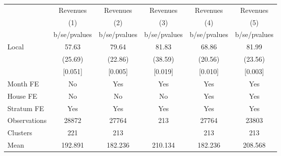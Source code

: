 {
\def\sym#1{\ifmmode^{#1}\else\(^{#1}\)\fi}
\begin{tabular}{l*{5}{c}}
\toprule
                &\multicolumn{1}{c}{Revenues}&\multicolumn{1}{c}{Revenues}&\multicolumn{1}{c}{Revenues}&\multicolumn{1}{c}{Revenues}&\multicolumn{1}{c}{Revenues}\\
                &\multicolumn{1}{c}{(1)}&\multicolumn{1}{c}{(2)}&\multicolumn{1}{c}{(3)}&\multicolumn{1}{c}{(4)}&\multicolumn{1}{c}{(5)}\\
                &b/se/pvalues&b/se/pvalues&b/se/pvalues&b/se/pvalues&b/se/pvalues\\
\midrule
Local           &    57.63&    79.64&    81.83&    68.86&    81.99\\
                &  (25.69)&  (22.86)&  (38.59)&  (20.56)&  (23.56)\\
                &  [0.051]&  [0.005]&  [0.019]&  [0.010]&  [0.003]\\
Month FE        &       No&      Yes&      Yes&      Yes&      Yes\\
House FE        &       No&       No&       No&      Yes&      Yes\\
Stratum FE      &      Yes&      Yes&      Yes&      Yes&      Yes\\
\midrule
Observations    &    28872&    27764&      213&    27764&    23803\\
Clusters        &      221&      213&         &      213&      213\\
Mean            &  192.891&  182.236&  210.134&  182.236&  208.568\\
\bottomrule
\end{tabular}
}
